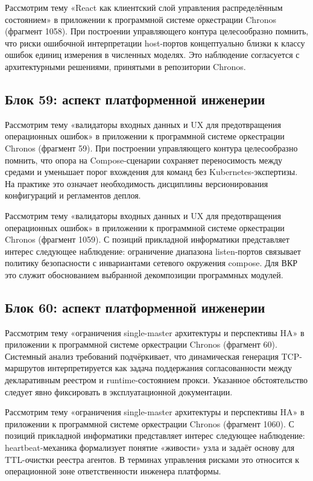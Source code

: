  Рассмотрим тему «React как клиентский слой управления распределённым состоянием» в приложении к программной системе оркестрации Chronos (фрагмент 1058). При построении управляющего контура целесообразно помнить, что риски ошибочной интерпретации host-портов концептуально близки к классу ошибок единиц измерения в численных моделях. Это наблюдение согласуется с архитектурными решениями, принятыми в репозитории Chronos.

\subsection{Блок 59: аспект платформенной инженерии}
 Рассмотрим тему «валидаторы входных данных и UX для предотвращения операционных ошибок» в приложении к программной системе оркестрации Chronos (фрагмент 59). При построении управляющего контура целесообразно помнить, что опора на Compose-сценарии сохраняет переносимость между средами и уменьшает порог вхождения для команд без Kubernetes-экспертизы. На практике это означает необходимость дисциплины версионирования конфигураций и регламентов деплоя.

 Рассмотрим тему «валидаторы входных данных и UX для предотвращения операционных ошибок» в приложении к программной системе оркестрации Chronos (фрагмент 1059). С позиций прикладной информатики представляет интерес следующее наблюдение: ограничение диапазона listen-портов связывает политику безопасности с инвариантами сетевого окружения compose. Для ВКР это служит обоснованием выбранной декомпозиции программных модулей.

\subsection{Блок 60: аспект платформенной инженерии}
 Рассмотрим тему «ограничения single-master архитектуры и перспективы HA» в приложении к программной системе оркестрации Chronos (фрагмент 60). Системный анализ требований подчёркивает, что динамическая генерация TCP-маршрутов интерпретируется как задача поддержания согласованности между декларативным реестром и runtime-состоянием прокси. Указанное обстоятельство следует явно фиксировать в эксплуатационной документации.

 Рассмотрим тему «ограничения single-master архитектуры и перспективы HA» в приложении к программной системе оркестрации Chronos (фрагмент 1060). С позиций прикладной информатики представляет интерес следующее наблюдение: heartbeat-механика формализует понятие «живости» узла и задаёт основу для TTL-очистки реестра агентов. В терминах управления рисками это относится к операционной зоне ответственности инженера платформы.

